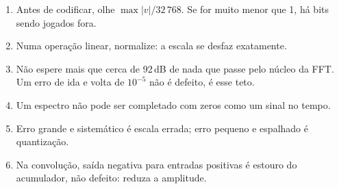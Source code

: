\begin{enumerate}
  \item Antes de codificar, olhe \(\max|v| / 32\,768\). Se for muito menor que
    1, há bits sendo jogados fora.
  \item Numa operação linear, normalize: a escala se desfaz exatamente.
  \item Não espere mais que cerca de 92\,dB de nada que passe pelo núcleo da
    FFT. Um erro de ida e volta de \(10^{-5}\) não é defeito, é esse teto.
  \item Um espectro não pode ser completado com zeros como um sinal no tempo.
  \item Erro grande e sistemático é escala errada; erro pequeno e espalhado é
    quantização.
  \item Na convolução, saída negativa para entradas positivas é estouro do
    acumulador, não defeito: reduza a amplitude.
\end{enumerate}
